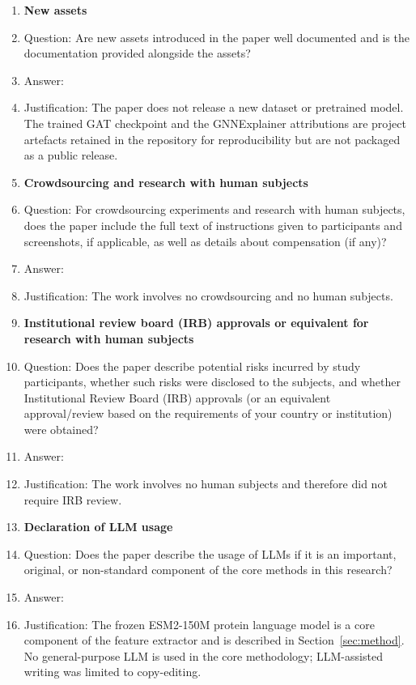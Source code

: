 \begin{enumerate}
\item {\bf New assets}
    \item[] Question: Are new assets introduced in the paper well documented and is the documentation provided alongside the assets?
    \item[] Answer: \answerNA{}
    \item[] Justification: The paper does not release a new dataset or pretrained
    model. The trained GAT checkpoint and the GNNExplainer attributions are
    project artefacts retained in the repository for reproducibility but are
    not packaged as a public release.

\item {\bf Crowdsourcing and research with human subjects}
    \item[] Question: For crowdsourcing experiments and research with human subjects, does the paper include the full text of instructions given to participants and screenshots, if applicable, as well as details about compensation (if any)?
    \item[] Answer: \answerNA{}
    \item[] Justification: The work involves no crowdsourcing and no human subjects.

\item {\bf Institutional review board (IRB) approvals or equivalent for research with human subjects}
    \item[] Question: Does the paper describe potential risks incurred by study participants, whether such risks were disclosed to the subjects, and whether Institutional Review Board (IRB) approvals (or an equivalent approval/review based on the requirements of your country or institution) were obtained?
    \item[] Answer: \answerNA{}
    \item[] Justification: The work involves no human subjects and therefore did
    not require IRB review.

\item {\bf Declaration of LLM usage}
    \item[] Question: Does the paper describe the usage of LLMs if it is an important, original, or non-standard component of the core methods in this research?
    \item[] Answer: \answerYes{}
    \item[] Justification: The frozen ESM2-150M protein language model is a core
    component of the feature extractor and is described in
    Section~\ref{sec:method}. No general-purpose LLM is used in the core
    methodology; LLM-assisted writing was limited to copy-editing.

\end{enumerate}

